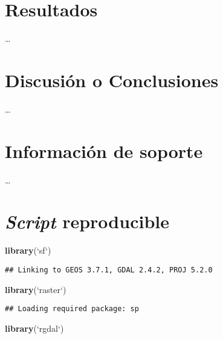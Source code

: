 \documentclass[11pt,]{article}
\newenvironment{Shaded}{\begin{snugshade}}{\end{snugshade}}
\newcommand{\KeywordTok}[1]{\textcolor[rgb]{0.13,0.29,0.53}{\textbf{#1}}}
\newcommand{\DataTypeTok}[1]{\textcolor[rgb]{0.13,0.29,0.53}{#1}}
\newcommand{\StringTok}[1]{\textcolor[rgb]{0.31,0.60,0.02}{#1}}
\newcommand{\NormalTok}[1]{#1}
\begin{document}
\section{Resultados}\label{resultados}

\ldots

\section{Discusión o Conclusiones}\label{discusiuxf3n-o-conclusiones}

\ldots

\section{Información de soporte}\label{informaciuxf3n-de-soporte}

\ldots

\section{\texorpdfstring{\emph{Script}
reproducible}{Script reproducible}}\label{script-reproducible}

\begin{Shaded}
\begin{Highlighting}[]
\KeywordTok{library}\NormalTok{(}\StringTok{`}\DataTypeTok{sf}\StringTok{`}\NormalTok{)}
\end{Highlighting}
\end{Shaded}

\begin{verbatim}
## Linking to GEOS 3.7.1, GDAL 2.4.2, PROJ 5.2.0
\end{verbatim}

\begin{Shaded}
\begin{Highlighting}[]
\KeywordTok{library}\NormalTok{(}\StringTok{`}\DataTypeTok{raster}\StringTok{`}\NormalTok{)}
\end{Highlighting}
\end{Shaded}

\begin{verbatim}
## Loading required package: sp
\end{verbatim}

\begin{Shaded}
\begin{Highlighting}[]
\KeywordTok{library}\NormalTok{(}\StringTok{`}\DataTypeTok{rgdal}\StringTok{`}\NormalTok{)}
\end{Highlighting}
\end{Shaded}
\end{document}
